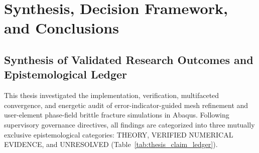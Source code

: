 \chapter{Synthesis, Decision Framework, and Conclusions}
\label{chap:synthesis_conclusions}

\section{Synthesis of Validated Research Outcomes and Epistemological Ledger}
\label{sec:synthesis_outcomes}

This thesis investigated the implementation, verification, multifaceted convergence, and energetic audit of error-indicator-guided mesh refinement and user-element phase-field brittle fracture simulations in Abaqus. Following supervisory governance directives, all findings are categorized into three mutually exclusive epistemological categories: THEORY, VERIFIED NUMERICAL EVIDENCE, and UNRESOLVED (Table~\ref{tab:thesis_claim_ledger}).

